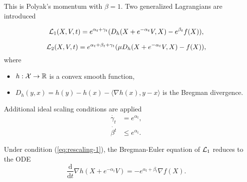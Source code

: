This is Polyak's momentum with $\beta = 1$. Two generalized Lagrangians are introduced \cite{wibisono2016variational} \cite{wilson2021lyapunov}

\begin{equation}
    \mathcal{L}_1(X,V,t) = e^{\alpha_t+\gamma_t}(D_h(X+e^{-\alpha_t}V, X)- e^{\beta_t}f(X)),
\end{equation}

\begin{equation}
    \mathcal{L}_2(X,V,t) = e^{\alpha_t+\beta_t+\gamma_t}(\mu D_h(X+e^{-\alpha_t}V, X)- f(X)),
    \label{eq:2nd-bregman}
\end{equation}
where
\begin{itemize}
    \item $h: \mathcal{X}\to{\mathbb{R}}$ is a convex smooth function,
    \item $D_h(y,x) = h(y) - h(x) - \langle \nabla h(x), y-x\rangle$ is the Bregman divergence.
\end{itemize}

Additional ideal scaling conditions are applied
\begin{subequations} \label{eq:rescaling}
    \begin{align}
        \dot{\gamma_t} & = e^{\alpha_t}, \label{eq:rescaling-1}   \\
        \dot{\beta^t}  & \le e^{\alpha_t}. \label{eq:rescaling-2}
    \end{align}
\end{subequations}

\begin{proposition}
    Under condition (\ref{eq:rescaling-1}), the Bregman-Euler equation of $\mathcal{L}_1$ reduces to the ODE
    \begin{equation}
        \label{eq:1st-bregman-ode}
        \dfrac{\mathrm{d}}{\mathrm{d}t}\nabla h(X + e^{-\alpha_t}V) = -e^{\alpha_t+\beta_t}\nabla f(X).
    \end{equation}
    \label{prop:1st-bregman-ode}
\end{proposition}

